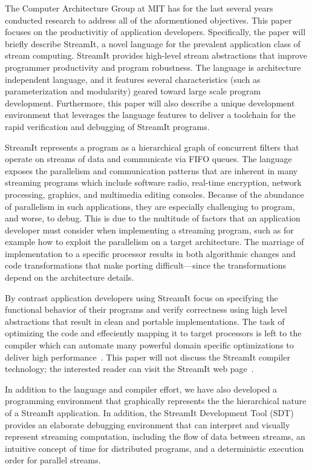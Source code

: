 \documentclass[11pt, letterpaper, onecolumn]{article}
\begin{document}
The Computer Architecture Group at  MIT has for the last several years
conducted  research to  address all  of the  aformentioned objectives.
This   paper    focuses   on   the    productivitiy   of   application
developers. Specifically, the paper  will briefly describe StreamIt, a
novel language  for the prevalent application class of  stream computing. StreamIt
provides  high-level  stream   abstractions  that  improve  programmer
productivity  and  program robustness.  The  language is  architecture
independent language, and it features several characteristics (such as
parameterization  and modularity)  geared toward  large  scale program
development.  Furthermore,  this paper  will  also  describe a  unique
development  environment  that  leverages  the  language  features  to
deliver  a  toolchain for  the  rapid  verification  and debugging  of
StreamIt programs.

StreamIt represents  a program as  a hierarchical graph  of concurrent
filters  that operate  on streams  of  data and  communicate via  FIFO
queues.    The  language  exposes   the     parallelism  and
communication patterns  that are  inherent in many  streaming programs
which   include   software   radio,  real-time   encryption,   network
processing, graphics, and multimedia editing consoles.  Because of the
abundance  of parallelism  in such  applications, they  are especially
challenging  to program,  and worse,  to debug.   This is  due  to the
multitude of factors that  an application developer must consider when
implementing a streaming  program, such as for example  how to exploit
the   parallelism  on   a  target   architecture.   The   marriage  of
implementation  to a  specific processor  results in  both algorithmic
changes and  code transformations that  make porting difficult---since
the transformations depend on the architecture details.

By contrast application developers  using StreamIt focus on specifying
the functional behavior of their programs and verify correctness using
high   level  abstractions   that   result  in   clean  and   portable
implementations.   The task  of  optimizing the  code and  effeciently
mapping  it to target  processors is  left to  the compiler  which can
automate many  powerful domain specific optimizations  to deliver high
performance~\cite{streambit, linear, statespace}. This paper will not
discuss the StreamIt compiler technology; the interested reader can
visit the StreamIt web page~\cite{streamit-web}.

In  addition  to  the  language  and compiler  effort,  we  have  also
developed  a programming environment  that graphically  represents the
the hierarchical  nature of a StreamIt application.   In addition, the
StreamIt  Development  Tool  (SDT)  provides  an  elaborate  debugging
environment  that  can  interpret  and  visually  represent  streaming
computation, including  the flow of data between  streams, an intuitive
concept  of  time  for   distributed  programs,  and  a  deterministic
execution order for parallel streams.
\end{document}
